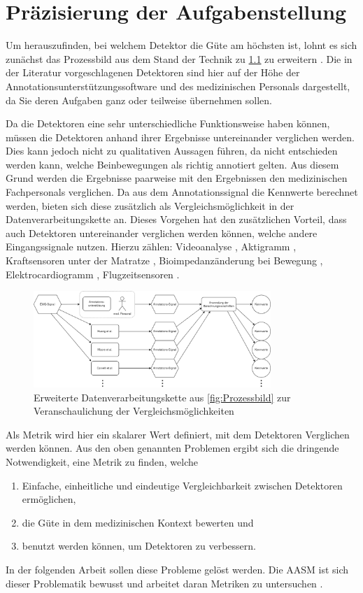 \chapter{Präzisierung der Aufgabenstellung}\label{chap:Präzisierung_der_Aufgabenstellung}


Um herauszufinden, bei welchem Detektor die Güte am höchsten ist, lohnt es sich zunächst das Prozessbild aus dem Stand der Technik zu \ref{fig:Prozessbild_erw} zu erweitern . Die in der Literatur vorgeschlagenen Detektoren sind hier auf der Höhe der Annotationsunterstützungssoftware und des medizinischen Personals dargestellt, da Sie deren Aufgaben ganz oder teilweise übernehmen sollen. 

Da die Detektoren eine sehr unterschiedliche Funktionsweise haben können, müssen die Detektoren anhand ihrer Ergebnisse untereinander verglichen werden. Dies kann jedoch nicht zu qualitativen Aussagen führen, da nicht entschieden werden kann, welche Beinbewegungen als richtig annotiert gelten. Aus diesem Grund werden die Ergebnisse paarweise mit den Ergebnissen den medizinischen Fachpersonals verglichen. Da aus dem Annotationssignal die Kennwerte berechnet werden, bieten sich diese zusätzlich als Vergleichsmöglichkeit in der Datenverarbeitungskette an.
Dieses Vorgehen hat den zusätzlichen Vorteil, dass auch Detektoren untereinander verglichen werden können, welche andere Eingangssignale nutzen. Hierzu zählen: Videoanalyse \cite{robust}, Aktigramm \cite{PDS}, Kraftsensoren unter der Matratze \cite{Kraft}, Bioimpedanzänderung bei Bewegung \cite{Mehrkanal-BioimpedanzInstrumentierung}, Elektrocardiogramm \cite{cardio}, Flugzeitsensoren \cite{timeofflight}. 


\begin{figure}[!ht]%
	\begin{center}
	\includegraphics[width=0.80\textwidth]{./Bilder/Prozessbildrot_erweitert.drawio (1).png}
	\end{center}
	\caption{Erweiterte Datenverarbeitungskette aus \ref{fig:Prozessbild} zur Veranschaulichung der Vergleichsmöglichkeiten}%
	\label{fig:Prozessbild_erw}%
\end{figure}
\newpage
Als Metrik wird hier ein skalarer Wert definiert, mit dem Detektoren Verglichen werden können.
Aus den oben genannten Problemen ergibt sich die dringende Notwendigkeit, eine Metrik zu finden, welche 
\begin{enumerate}
	\item Einfache, einheitliche und eindeutige Vergleichbarkeit zwischen Detektoren ermöglichen,
	\item die Güte in dem medizinischen Kontext bewerten und 
	\item benutzt werden können, um Detektoren zu verbessern.
\end{enumerate}

In der folgenden Arbeit sollen diese Probleme gelöst werden.
Die AASM ist sich dieser Problematik bewusst und arbeitet daran Metriken zu untersuchen \cite{comingsoon}. 
